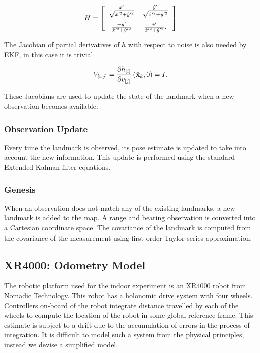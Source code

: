$$
H = 
 \left[ \begin {array}{cc}
   \frac{\hat{x}'}{ \sqrt{\hat{x}'^2+\hat{y}'^2} } & 
   \frac{\hat{y}'}{ \sqrt{\hat{x}'^2+\hat{y}'^2} } \\ \noalign{\medskip}
   \frac{-\hat{y}'}{ \hat{x}'^2+\hat{y}'^2 } & 
   \frac{ \hat{x}'}{ \hat{x}'^2+\hat{y}'^2 }.
\end{array} \right] 
$$

The Jacobian of partial derivatives of $h$ with respect
to noise is also needed by EKF, in this case it is trivial

$$
V_{[i,j]} = \frac{\partial h_{[i]}}{\partial v_{[j]}}
             \left(\hat{\bf x}_k , 0 \right) = I.
$$

These Jacobians are used to update the state of the landmark when a
new observation becomes available.


\subsubsection{Observation Update}

Every time the landmark is observed, its pose estimate is updated to
take into account the new information. This update is performed using
the standard Extended Kalman filter equations.


\subsubsection{Genesis}

When an observation does not match any of the existing landmarks, a
new landmark is added to the map. A range and bearing observation is
converted into a Cartesian coordinate space. The covariance of the
landmark is computed from the covariance of the measurement using
first order Taylor series approximation.


\subsection{XR4000: Odometry Model}

The robotic platform used for the indoor experiment is an XR4000 robot
from Nomadic Technology. This robot has a holonomic drive system with
four wheels. Controllers on-board of the robot integrate distance
travelled by each of the wheels to compute the location of the robot
in some global reference frame. This estimate is subject to a drift
due to the accumulation of errors in the process of integration. It is
difficult to model such a system from the physical principles, instead
we devise a simplified model.

